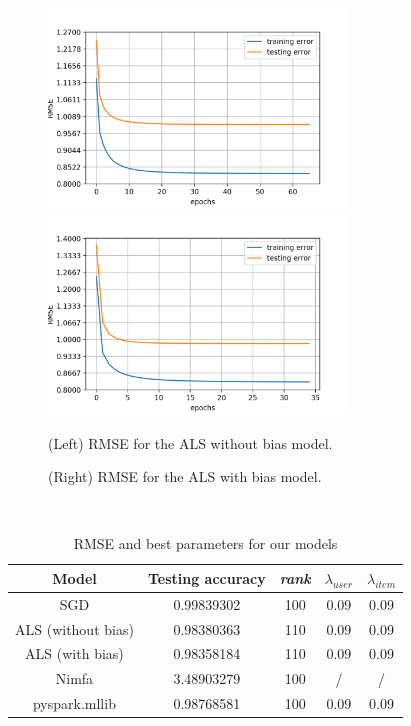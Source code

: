 \documentclass[a4paper]{article}
\begin{document}
\mbox{}\\

\begin{figure}[h]
  \centering
  \includegraphics[width=8cm]{RMSE_ALS.png}
  \includegraphics[width=8cm]{RMSE_ALS_BIAS.png}
  \label{fig:figure 3}
  \caption{(Left) RMSE for the ALS without bias model.}
  \label{fig:figure 4}
  \caption{(Right) RMSE for the ALS with bias model.}
\end{figure}

\mbox{}\\

\begin{table}[h!]
  \centering
  \begin{tabular}{|c|c|c|c|c|}
    \hline
    \textbf{Model} & \textbf{Testing accuracy} & \textbf{\textit{rank}} & \boldmath\(\lambda_{user}\)& \boldmath\(\lambda_{item}\)\\
    \hline
    SGD & 0.99839302 & 100 & 0.09 & 0.09\\
    \hline
    ALS (without bias) & 0.98380363 & 110 & 0.09 & 0.09\\
    \hline
    ALS (with bias) & 0.98358184 & 110 & 0.09 & 0.09\\
    \hline
    Nimfa & 3.48903279 & 100 & / & / \\
    \hline
    pyspark.mllib & 0.98768581 & 100 & 0.09 & 0.09\\
    \hline
  \end{tabular}
  \caption{RMSE and best parameters for our models}
  \label{tab:table 1}
\end{table}
\mbox{}\\
\end{document}
